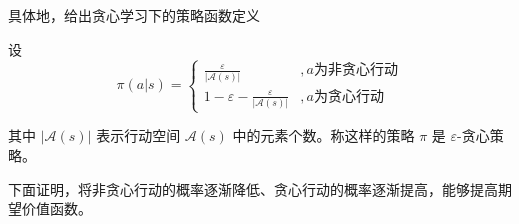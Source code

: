具体地，给出贪心学习下的策略函数定义

\begin{Definition}
    设
    \begin{equation}
        \pi(a|s)=
        \begin{cases}
            \frac{\varepsilon}{|\mathcal A(s)|}&, a\text{为非贪心行动}\\
            1-\varepsilon-\frac{\varepsilon}{|\mathcal A(s)|}&, a\text{为贪心行动}
        \end{cases}
    \end{equation}

其中 $|\mathcal{A}(s)|$ 表示行动空间 $\mathcal{A}(s)$ 中的元素个数。称这样的策略 $\pi$ 是 $\varepsilon$-贪心策略。
\end{Definition}

下面证明，将非贪心行动的概率逐渐降低、贪心行动的概率逐渐提高，能够提高期望价值函数。

